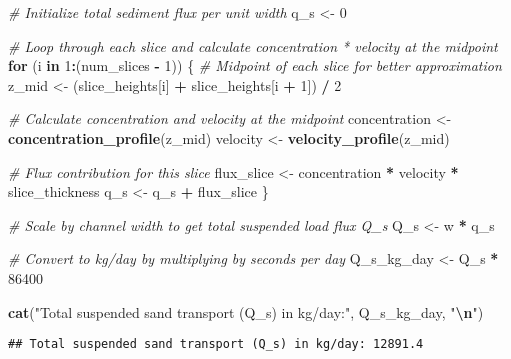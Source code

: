 \documentclass[
]{article}
\newenvironment{Shaded}{\begin{snugshade}}{\end{snugshade}}
\newcommand{\CommentTok}[1]{\textcolor[rgb]{0.56,0.35,0.01}{\textit{#1}}}
\newcommand{\ControlFlowTok}[1]{\textcolor[rgb]{0.13,0.29,0.53}{\textbf{#1}}}
\newcommand{\DecValTok}[1]{\textcolor[rgb]{0.00,0.00,0.81}{#1}}
\newcommand{\FunctionTok}[1]{\textcolor[rgb]{0.13,0.29,0.53}{\textbf{#1}}}
\newcommand{\NormalTok}[1]{#1}
\newcommand{\OtherTok}[1]{\textcolor[rgb]{0.56,0.35,0.01}{#1}}
\newcommand{\SpecialCharTok}[1]{\textcolor[rgb]{0.81,0.36,0.00}{\textbf{#1}}}
\newcommand{\StringTok}[1]{\textcolor[rgb]{0.31,0.60,0.02}{#1}}
\begin{document}
\begin{Shaded}
\begin{Highlighting}[]
\CommentTok{\# Initialize total sediment flux per unit width}
\NormalTok{q\_s }\OtherTok{\textless{}{-}} \DecValTok{0}

\CommentTok{\# Loop through each slice and calculate concentration * velocity at the midpoint}
\ControlFlowTok{for}\NormalTok{ (i }\ControlFlowTok{in} \DecValTok{1}\SpecialCharTok{:}\NormalTok{(num\_slices }\SpecialCharTok{{-}} \DecValTok{1}\NormalTok{)) \{}
  \CommentTok{\# Midpoint of each slice for better approximation}
\NormalTok{  z\_mid }\OtherTok{\textless{}{-}}\NormalTok{ (slice\_heights[i] }\SpecialCharTok{+}\NormalTok{ slice\_heights[i }\SpecialCharTok{+} \DecValTok{1}\NormalTok{]) }\SpecialCharTok{/} \DecValTok{2}
  
  \CommentTok{\# Calculate concentration and velocity at the midpoint}
\NormalTok{  concentration }\OtherTok{\textless{}{-}} \FunctionTok{concentration\_profile}\NormalTok{(z\_mid)}
\NormalTok{  velocity }\OtherTok{\textless{}{-}} \FunctionTok{velocity\_profile}\NormalTok{(z\_mid)}
  
  \CommentTok{\# Flux contribution for this slice}
\NormalTok{  flux\_slice }\OtherTok{\textless{}{-}}\NormalTok{ concentration }\SpecialCharTok{*}\NormalTok{ velocity }\SpecialCharTok{*}\NormalTok{ slice\_thickness}
\NormalTok{  q\_s }\OtherTok{\textless{}{-}}\NormalTok{ q\_s }\SpecialCharTok{+}\NormalTok{ flux\_slice}
\NormalTok{\}}

\CommentTok{\# Scale by channel width to get total suspended load flux Q\_s}
\NormalTok{Q\_s }\OtherTok{\textless{}{-}}\NormalTok{ w }\SpecialCharTok{*}\NormalTok{ q\_s}

\CommentTok{\# Convert to kg/day by multiplying by seconds per day}
\NormalTok{Q\_s\_kg\_day }\OtherTok{\textless{}{-}}\NormalTok{ Q\_s }\SpecialCharTok{*} \DecValTok{86400}

\FunctionTok{cat}\NormalTok{(}\StringTok{"Total suspended sand transport (Q\_s) in kg/day:"}\NormalTok{, Q\_s\_kg\_day, }\StringTok{"}\SpecialCharTok{\textbackslash{}n}\StringTok{"}\NormalTok{)}
\end{Highlighting}
\end{Shaded}

\begin{verbatim}
## Total suspended sand transport (Q_s) in kg/day: 12891.4
\end{verbatim}
\end{document}
